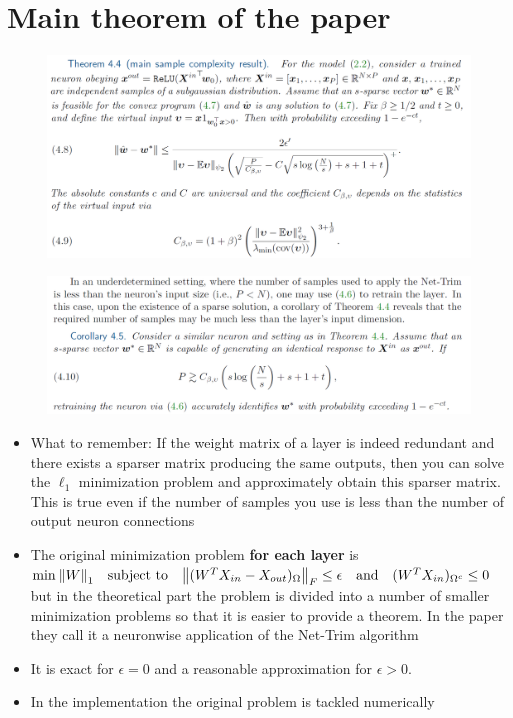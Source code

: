 \newpage
\section{Main theorem of the paper}
	\begin{figure}[H]
	\centering
	\includegraphics[width=1\linewidth]{./figs/theorem.jpg}  
	\caption*{}
\end{figure}
\setlength{\belowcaptionskip}{-40pt}
	\begin{figure}[H]
	\centering
	\includegraphics[width=1\linewidth]{./figs/corollary.png}  
	\caption*{}
\end{figure}
\setlength{\belowcaptionskip}{-20pt}

\begin{itemize}
	\item What to remember: If the weight matrix of a layer is indeed redundant and there exists a sparser matrix producing the same outputs, then you can solve the $\ell_1$ minimization problem and approximately obtain this sparser matrix. This is true even if the number of samples you use is less than the number of output neuron connections  
	\item The original minimization problem \textbf{for each layer} is \\
	$\min_{}\norm{W}_1 \quad \text{subject to} \quad \norm{(W^T X_{in}-X_{out})_{\Omega}}_F \leq \epsilon \quad \text{and}\quad (W^T X_{in})_{\Omega^c} \leq 0 $ \\
	but in the theoretical part the problem is divided into a number of smaller minimization problems so that it is easier to provide a theorem. In the paper they call it a neuronwise application of the Net-Trim algorithm
	\item It is exact for $\epsilon = 0$ and a reasonable approximation for $\epsilon >0$. 
	\item In the implementation the original problem is tackled numerically	
\end{itemize}


